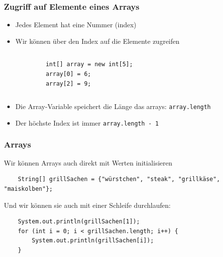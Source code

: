 \documentclass{../../presentation}
\begin{document}
\begin{frame}[fragile]
    \frametitle{Zugriff auf Elemente eines Arrays}
    \begin{itemize}
        \item Jedes Element hat eine Nummer (index)
        \item Wir können über den Index auf die Elemente zugreifen
    \end{itemize}
    \begin{columns}
        \begin{verbatim}
            int[] array = new int[5];
            array[0] = 6;
            array[2] = 9;
        \end{verbatim}

        \begin{center}
        \end{center}
    \end{columns}

    \vspace{0.5cm}

    \begin{itemize}
        \item Die Array-Variable speichert die Länge das arrays: \texttt{array.length}
        \item Der höchste Index ist immer \texttt{array.length - 1}
    \end{itemize}
\end{frame}

\begin{frame}[fragile]
    \frametitle{Arrays}
    Wir können Arrays auch direkt mit Werten initialisieren
    \begin{verbatim}
    String[] grillSachen = {"würstchen", "steak", "grillkäse", "maiskolben"};
    \end{verbatim}
    Und wir können sie auch mit einer Schleife durchlaufen:
    \begin{verbatim}
    System.out.println(grillSachen[1]);
    for (int i = 0; i < grillSachen.length; i++) {
        System.out.println(grillSachen[i]);
    }
    \end{verbatim}
\end{frame}
\end{document}
